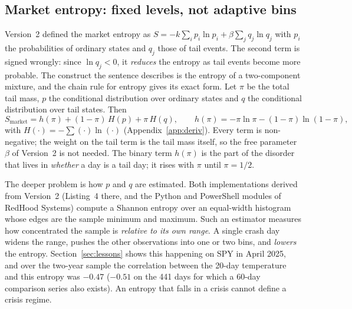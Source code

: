 \documentclass[11pt]{article}
\begin{document}
\subsection{Market entropy: fixed levels, not adaptive bins}\label{sec:entropy}
Version~2 defined the market entropy as $S=-k\sum_i p_i\ln p_i+\beta\sum_j q_j\ln q_j$ with $p_i$ the probabilities of ordinary states and $q_j$ those of tail events. The second term is signed wrongly: since $\ln q_j<0$, it \emph{reduces} the entropy as tail events become more probable. The construct the sentence describes is the entropy of a two-component mixture, and the chain rule for entropy \citep{cover2006} gives its exact form. Let $\pi$ be the total tail mass, $p$ the conditional distribution over ordinary states and $q$ the conditional distribution over tail states. Then
\begin{equation}
S_{\mathrm{market}}=h(\pi)+(1-\pi)\,H(p)+\pi\,H(q),\qquad h(\pi)=-\pi\ln\pi-(1-\pi)\ln(1-\pi), \label{eq:mixture}
\end{equation}
with $H(\cdot)=-\sum(\cdot)\ln(\cdot)$ (Appendix~\ref{app:deriv}). Every term is non-negative; the weight on the tail term is the tail mass itself, so the free parameter $\beta$ of Version~2 is not needed. The binary term $h(\pi)$ is the part of the disorder that lives in \emph{whether} a day is a tail day; it rises with $\pi$ until $\pi=1/2$.

The deeper problem is how $p$ and $q$ are estimated. Both implementations derived from Version~2 (Listing~4 there, and the Python and PowerShell modules of RedHood Systems) compute a Shannon entropy over an equal-width histogram whose edges are the sample minimum and maximum. Such an estimator measures how concentrated the sample is \emph{relative to its own range}. A single crash day widens the range, pushes the other observations into one or two bins, and \emph{lowers} the entropy. Section~\ref{sec:lessons} shows this happening on SPY in April 2025, and over the two-year sample the correlation between the 20-day temperature and this entropy was $-0.47$ ($-0.51$ on the 441 days for which a 60-day comparison series also exists). An entropy that falls in a crisis cannot define a crisis regime.
\end{document}
